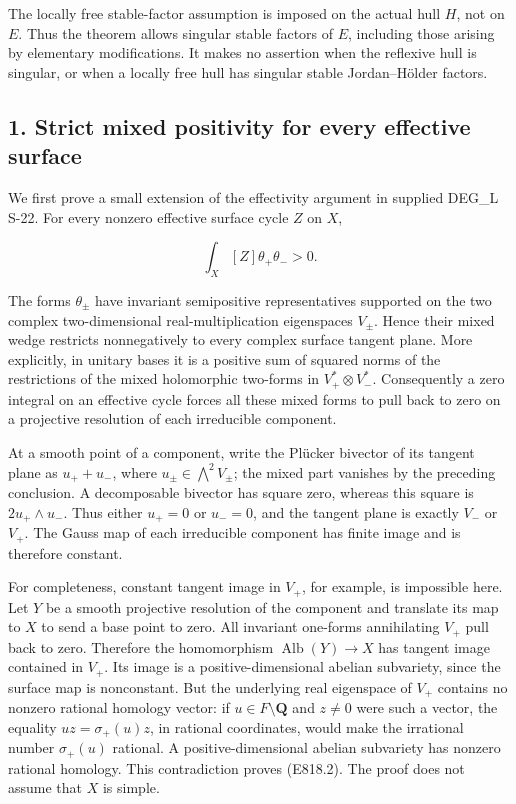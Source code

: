 The locally free stable-factor assumption is imposed on the actual hull
\(H\), not on \(E\). Thus the theorem allows singular stable factors of
\(E\), including those arising by elementary modifications. It makes no
assertion when the reflexive hull is singular, or when a locally free
hull has singular stable Jordan--Hölder factors.

\subsection{1. Strict mixed positivity for every effective
surface}\label{SF-E818-strict-mixed-positivity-for-every-effective-surface}

We first prove a small extension of the effectivity argument in supplied
DEG\_L S-22. For every nonzero effective surface cycle \(Z\) on \(X\),

\[
 \int_X[Z]\theta_+\theta_->0.
 \tag{E818.2}
\]

The forms \(\theta_\pm\) have invariant semipositive representatives
supported on the two complex two-dimensional real-multiplication
eigenspaces \(V_\pm\). Hence their mixed wedge restricts nonnegatively
to every complex surface tangent plane. More explicitly, in unitary
bases it is a positive sum of squared norms of the restrictions of the
mixed holomorphic two-forms in \(V_+^*\otimes V_-^*\). Consequently a
zero integral on an effective cycle forces all these mixed forms to pull
back to zero on a projective resolution of each irreducible component.

At a smooth point of a component, write the Plücker bivector of its
tangent plane as \(u_++u_-\), where \(u_\pm\in\bigwedge^2V_\pm\); the
mixed part vanishes by the preceding conclusion. A decomposable bivector
has square zero, whereas this square is \(2u_+\wedge u_-\). Thus either
\(u_+=0\) or \(u_-=0\), and the tangent plane is exactly \(V_-\) or
\(V_+\). The Gauss map of each irreducible component has finite image
and is therefore constant.

For completeness, constant tangent image in \(V_+\), for example, is
impossible here. Let \(Y\) be a smooth projective resolution of the
component and translate its map to \(X\) to send a base point to zero.
All invariant one-forms annihilating \(V_+\) pull back to zero.
Therefore the homomorphism \(\operatorname{Alb}(Y)\to X\) has tangent
image contained in \(V_+\). Its image is a positive-dimensional abelian
subvariety, since the surface map is nonconstant. But the underlying
real eigenspace of \(V_+\) contains no nonzero rational homology vector:
if \(u\in F\setminus\mathbf Q\) and \(z\ne0\) were such a vector, the
equality \(uz=\sigma_+(u)z\), in rational coordinates, would make the
irrational number \(\sigma_+(u)\) rational. A positive-dimensional
abelian subvariety has nonzero rational homology. This contradiction
proves (E818.2). The proof does not assume that \(X\) is simple.

